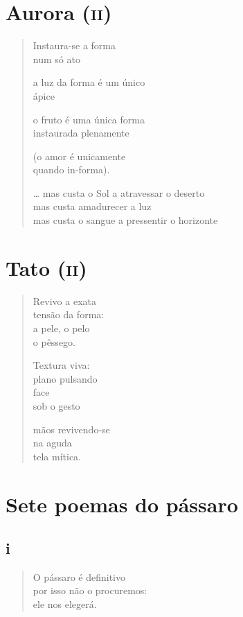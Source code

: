 \chapter{Aurora (\textsc{ii})}

\begin{verse}
Instaura-se a forma\\
num só ato

a luz da forma é um único\\
ápice

o fruto é uma única forma\\
instaurada plenamente

(o amor é unicamente\\
quando in-forma).

\ldots{} mas custa o Sol a atravessar o deserto\\
\quad mas custa amadurecer a luz\\
\quad mas custa o sangue a pressentir o horizonte
\end{verse}

\chapter{Tato (\textsc{ii})}

\begin{verse}
Revivo a exata\\
tensão da forma:\\
a pele, o pelo\\
o pêssego.

Textura viva:\\
plano pulsando\\
face\\
sob o gesto

mãos revivendo-se\\
na aguda\\
tela mítica.
\end{verse}

\chapter{Sete poemas do pássaro}

\section{i}

\begin{verse}
O pássaro é definitivo\\
por isso não o procuremos:\\
ele nos elegerá.
\end{verse}

